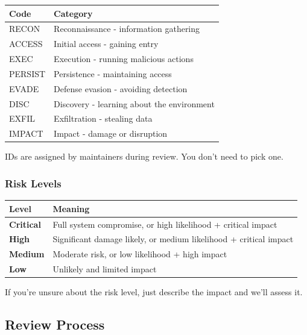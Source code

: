 \begin{table}[h]
\centering
\small
\begin{tabular}{|l|l|}
\hline
Code & Category \\
\hline
RECON & Reconnaissance - information gathering \\
\hline
ACCESS & Initial access - gaining entry \\
\hline
EXEC & Execution - running malicious actions \\
\hline
PERSIST & Persistence - maintaining access \\
\hline
EVADE & Defense evasion - avoiding detection \\
\hline
DISC & Discovery - learning about the environment \\
\hline
EXFIL & Exfiltration - stealing data \\
\hline
IMPACT & Impact - damage or disruption \\
\hline
\end{tabular}
\end{table}



IDs are assigned by maintainers during review. You don't need to pick one.

\subsubsection{Risk Levels}



\begin{table}[h]
\centering
\small
\begin{tabular}{|l|l|}
\hline
Level & Meaning \\
\hline
\textbf{Critical} & Full system compromise, or high likelihood + critical impact \\
\hline
\textbf{High} & Significant damage likely, or medium likelihood + critical impact \\
\hline
\textbf{Medium} & Moderate risk, or low likelihood + high impact \\
\hline
\textbf{Low} & Unlikely and limited impact \\
\hline
\end{tabular}
\end{table}



If you're unsure about the risk level, just describe the impact and we'll assess it.

\subsection{Review Process}


